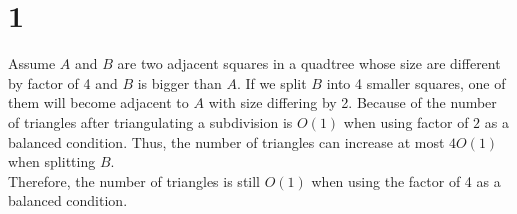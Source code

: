 
\section*{1}

Assume $A$ and $B$ are two adjacent squares in a quadtree whose size are different
by factor of 4 and $B$ is bigger than $A$. If we split $B$ into 4 smaller squares,
one of them will become adjacent to $A$ with size differing by 2. Because of the
number of triangles after triangulating a subdivision is $O(1)$ when using factor of $2$
as a balanced condition. Thus, the number of triangles can increase at most $4O(1)$
when splitting $B$. \\

Therefore, the number of triangles is still $O(1)$ when using the factor of 4 as
a balanced condition.

